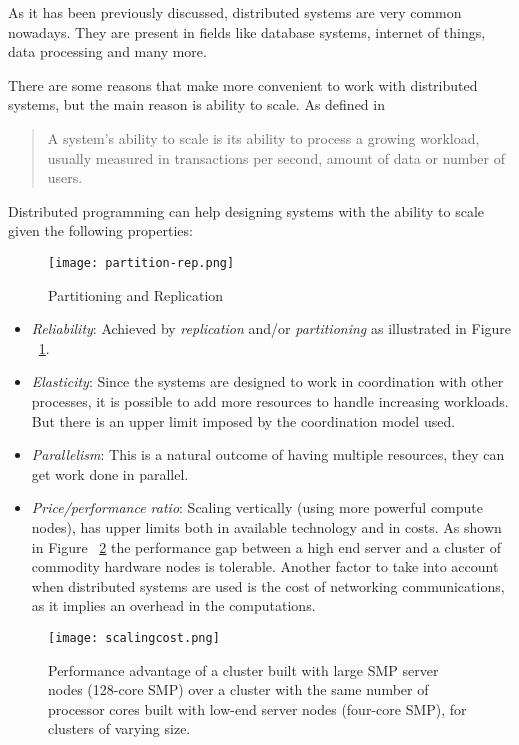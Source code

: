 As it has been previously discussed, distributed systems are very common
nowadays. They are present in fields like database systems, internet of things,
data processing and many more.

There are some reasons that make more convenient to work with distributed
systems, but the main reason is ability to scale. As defined in \cite{cloudadmin}
\begin{quote}
  A system's ability to scale is its ability to process a growing workload,
  usually measured in transactions per second, amount of data or number of
  users.
\end{quote}

Distributed programming can help designing systems with the ability to scale given
the following properties:

\begin{figure}[!h]
\begin{center}
\texttt{[image: partition-rep.png]}
\caption{Partitioning and Replication}
\label{fig:partitioning}
\end{center}
\end{figure}

\begin{itemize}
\item \textit{Reliability}: Achieved by \textit{replication} and/or
  \textit{partitioning} as illustrated in Figure ~\ref{fig:partitioning}.
\item \textit{Elasticity}: Since the systems are designed to work in
  coordination with other processes, it is possible to add more resources to
  handle increasing workloads. But there is an upper limit imposed by the
  coordination model used.
\item \textit{Parallelism}: This is a natural outcome of having multiple resources, they
  can get work done in parallel.
\item \textit{Price/performance ratio}: Scaling vertically (using more powerful
  compute nodes), has upper limits both in available technology and in costs. As
  shown in Figure ~\ref{fig:highend} the performance gap between a high end
  server and a cluster of commodity hardware nodes is tolerable. Another factor
  to take into account when distributed systems are used is the cost of
  networking communications, as it implies an overhead in the computations.
\end{itemize}

\begin{figure}[!h]
\begin{center}
\texttt{[image: scalingcost.png]}
\caption{Performance advantage of a cluster built with large SMP server nodes
  (128-core SMP) over a cluster with the same number of processor cores built
  with low-end server nodes (four-core SMP), for clusters of varying
  size.\cite{Datacenter}}
\label{fig:highend}
\end{center}
\end{figure}


